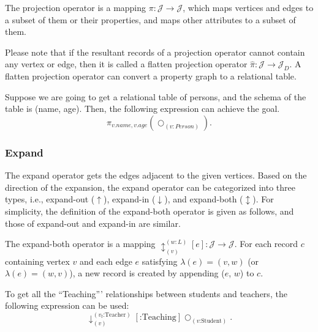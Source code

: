 \begin{definition}
    The projection operator is a mapping $\pi : \mathcal{J} \rightarrow \mathcal{J}$, which maps vertices and edges to a subset of them or their properties, and maps other attributes to a subset of them.
\end{definition}

Please note that if the resultant records of a projection operator cannot contain any vertex or edge, then it is called a flatten projection operator $\hat{\pi} : \mathcal{J} \rightarrow \mathcal{J}_D$.
A flatten projection operator can convert a property graph to a relational table.

\begin{example}
    Suppose we are going to get a relational table of persons, and the schema of the table is (name, age).
    Then, the following expression can achieve the goal.
    \begin{equation*}
        \pi_{v.name, v.age}(\bigcirc_{(v:Person)}).
    \end{equation*}
\end{example}

\subsubsection{Expand}

The expand operator gets the edges adjacent to the given vertices.
Based on the direction of the expansion, the expand operator can be categorized into three types, i.e., expand-out ($\uparrow$), expand-in ($\downarrow$), and expand-both ($\updownarrow$).
For simplicity, the definition of the expand-both operator is given as follows, and those of expand-out and expand-in are similar.

\begin{definition}
    The expand-both operator is a mapping $\updownarrow_{(v)}^{(w:L)}[e] : \mathcal{J} \rightarrow \mathcal{J}$.
    For each record $c$ containing vertex $v$ and each edge $e$ satisfying $\lambda(e) = (v, w)$ (or $\lambda(e) = (w, v)$), a new record is created by appending ($e$, $w$) to $c$.
\end{definition}
 
\begin{example}
    To get all the ``Teaching''' relationships between students and teachers, the following expression can be used:
    \begin{equation*}
        \downarrow_{(v)}^{(v_t\text{:Teacher})}[\text{:Teaching}]\bigcirc_{(v\text{:Student})}.
    \end{equation*}
\end{example}

